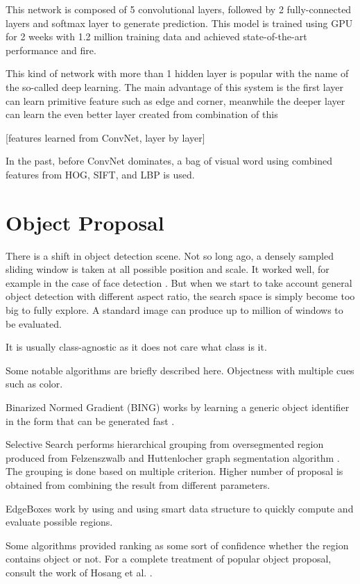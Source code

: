 \documentclass[a4paper,11pt]{kth-mag}
\begin{document}
This network is composed of 5 convolutional layers, followed by 2 fully-connected layers and softmax layer to generate prediction.
This model is trained using GPU for 2 weeks with 1.2 million training data and achieved state-of-the-art performance and fire.

This kind of network with more than 1 hidden layer is popular with the name of the so-called deep learning. The main advantage of this system is the first layer can learn primitive feature such as edge and corner, meanwhile the deeper layer can learn the even better layer created from combination of this 

[features learned from ConvNet, layer by layer]

In the past, before ConvNet dominates, a bag of visual word using combined features from HOG, SIFT, and LBP is used.

\section{Object Proposal}
There is a shift in object detection scene. Not so long ago, a densely sampled sliding window is taken at all possible position and scale. It worked well, for example in the case of face detection \cite{violajones}. But when we start to take account general object detection with different aspect ratio, the search space is simply become too big to fully explore. A standard image can produce up to million of windows to be evaluated.

It is usually class-agnostic as it does not care what class is it.

Some notable algorithms are briefly described here.
Objectness \cite{alexe} with multiple cues such as color.

Binarized Normed Gradient (BING) works by learning a generic object identifier in the form that can be generated fast \cite{bing}.

Selective Search \cite{selectivesearch} performs hierarchical grouping from oversegmented region produced from Felzenszwalb and Huttenlocher graph segmentation algorithm \cite{felzenszwalb}. The grouping is done based on multiple criterion. Higher number of proposal is obtained from combining the result from different parameters.

EdgeBoxes work by using and using smart data structure to quickly compute and evaluate possible regions.

Some algorithms provided ranking as some sort of confidence whether the region contains object or not. For a complete treatment of popular object proposal, consult the work of Hosang et al. \cite{hosang}.
\end{document}
